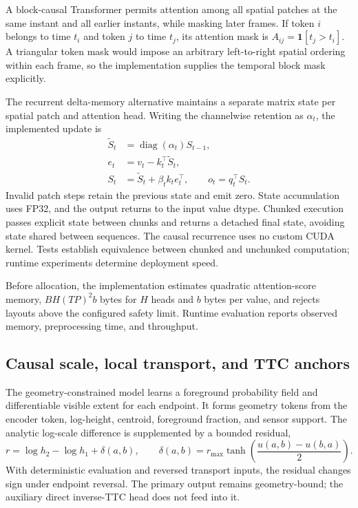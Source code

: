 A block-causal Transformer permits attention among all spatial patches at the same instant and all earlier instants, while masking later frames. If token $i$ belongs to time $t_i$ and token $j$ to time $t_j$, its attention mask is $A_{ij}=\mathbf 1[t_j>t_i]$. A triangular token mask would impose an arbitrary left-to-right spatial ordering within each frame, so the implementation supplies the temporal block mask explicitly.

The recurrent delta-memory alternative maintains a separate matrix state per spatial patch and attention head. Writing the channelwise retention as $\alpha_t$, the implemented update is
\begin{align}
 \widetilde S_t&=\operatorname{diag}(\alpha_t)S_{t-1},\\
 e_t&=v_t-k_t^\top\widetilde S_t,\\
 S_t&=\widetilde S_t+\beta_t k_t e_t^\top,\qquad o_t=q_t^\top S_t.
\end{align}
Invalid patch steps retain the previous state and emit zero. State accumulation uses FP32, and the output returns to the input value dtype. Chunked execution passes explicit state between chunks and returns a detached final state, avoiding state shared between sequences. The causal recurrence uses no custom CUDA kernel. Tests establish equivalence between chunked and unchunked computation; runtime experiments determine deployment speed. 

Before allocation, the implementation estimates quadratic attention-score memory,
$B H (TP)^2 b$ bytes for $H$ heads and $b$ bytes per value, and rejects layouts above the configured safety limit. Runtime evaluation reports observed memory, preprocessing time, and throughput.

\subsection{Causal scale, local transport, and TTC anchors}
The geometry-constrained model learns a foreground probability field and differentiable visible extent for each endpoint. It forms geometry tokens from the encoder token, log-height, centroid, foreground fraction, and sensor support. The analytic log-scale difference is supplemented by a bounded residual,
\begin{equation}
 r=\log h_2-\log h_1+\delta(a,b),\qquad
 \delta(a,b)=r_{\max}\tanh\!\left(\frac{u(a,b)-u(b,a)}2\right).
\end{equation}
With deterministic evaluation and reversed transport inputs, the residual changes sign under endpoint reversal. The primary output remains geometry-bound; the auxiliary direct inverse-TTC head does not feed into it. 

